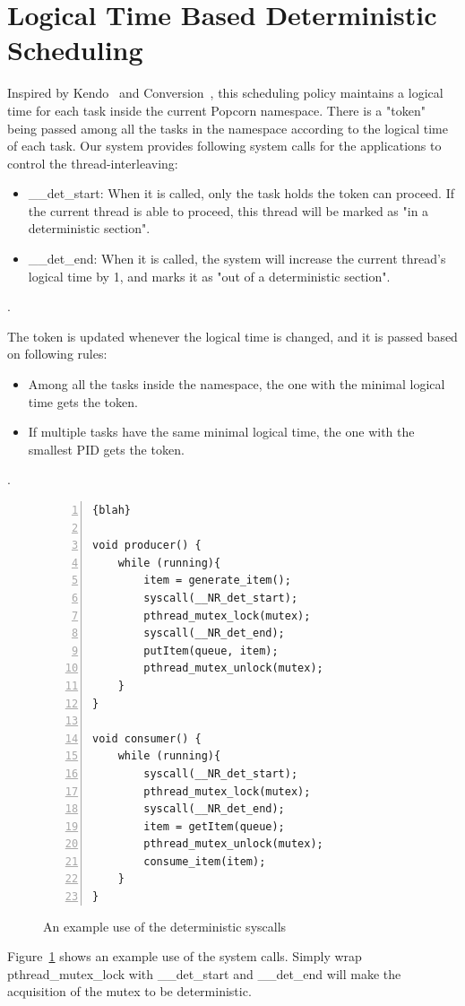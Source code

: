 \section{Logical Time Based Deterministic Scheduling} \label{sec:detsched}
Inspired by Kendo~\cite{olszewski2009kendo} and Conversion~\cite{merrifieldincreasing}, this scheduling policy maintains a logical time for each task inside the current Popcorn namespace. There is a "token" being passed among all the tasks in the namespace according to the logical time of each task. Our system provides following system calls for the applications to control the thread-interleaving:
\begin{itemize}
   \item \_\_det\_start: When it is called, only the task holds the token can proceed. If the current thread is able to proceed, this thread will be marked as "in a deterministic section".
   \item \_\_det\_end: When it is called, the system will increase the current thread's logical time by 1, and marks it as "out of a deterministic section".
\end{itemize}.

The token is updated whenever the logical time is changed, and it is passed based on following rules:
\begin{itemize}
   \item Among all the tasks inside the namespace, the one with the minimal logical time gets the token.
   \item If multiple tasks have the same minimal logical time, the one with the smallest PID gets the token.
\end{itemize}.

\begin{figure}
\centering
\begin{lstlisting}[numbers=left, frame=single, basicstyle=\small, breaklines]{blah}

void producer() {
    while (running){
        item = generate_item();
        syscall(__NR_det_start);
        pthread_mutex_lock(mutex);
        syscall(__NR_det_end);    
        putItem(queue, item);    
        pthread_mutex_unlock(mutex);
    }
}

void consumer() {
    while (running){
        syscall(__NR_det_start);
        pthread_mutex_lock(mutex);
        syscall(__NR_det_end);
        item = getItem(queue);    
        pthread_mutex_unlock(mutex);		
        consume_item(item);
    }
}
\end{lstlisting}
\caption{An example use of the deterministic syscalls}
\label{fig:example}
\end{figure}
Figure~\ref{fig:example} shows an example use of the system calls. Simply wrap pthread\_mutex\_lock with \_\_det\_start and \_\_det\_end will make the acquisition of the mutex to be deterministic.

